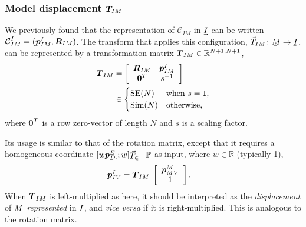 \subsubsection{Model displacement $\boldsymbol{T}_{\!IM}$}

We previously found that the representation of $\mathcal{C}_{IM}$ in $\uvec{I}$ can be written $\boldsymbol{\mathcal{C}}_{IM}^I = (\boldsymbol{p}_{IM}^I,\boldsymbol{R}_{IM})$. The transform that applies this configuration, $\vec{T}_{IM}\colon \ubar{M}\to\ubar{I}$, can be represented by a transformation matrix $\boldsymbol{T}_{IM} \in \mathbb{R}^{N+1,N+1}$,
%
\begin{align}
\dvec{T}_{IM} &= 
\left[\begin{array}{c c}
 \mat{R}_{IM}  & \dvec{p}_{IM}^I \\%
 \dvec{0}^T  &  s^{-1}
\end{array}\right] \nn &\in
\begin{cases}
\mathrm{SE}(N) & \mathrm{when}\ s=1,\\
\mathrm{Sim}(N) & \mathrm{otherwise},
\end{cases} \label{eq_homogeneous_transformation}
\end{align}
%
where $\boldsymbol{0}^T$ is a row zero-vector of length $N$ and $s$ is a scaling factor. 

Its usage is similar to that of the rotation matrix, except that it requires a homogeneous coordinate $[w\dvec{p}_{D\cdot}^E;w]\T\in\mathbb{P}$ as input, where $w\in\mathbb{R}$ (typically 1),
%
\begin{align}
\boldsymbol{p}_{IV}^I &= \boldsymbol{T}_{IM}\; 
\left[\begin{array}{c}\boldsymbol{p}_{MV}^M \\ 1
\end{array}\right].
\end{align}
%
When $\boldsymbol{T}_{IM}$ is left-multiplied as here, it should be interpreted as the \emph{displacement} of $\ubar{M}$ \emph{represented} in $\ubar{I}$, and \emph{vice versa} if it is right-multiplied. This is analogous to the rotation matrix. 




